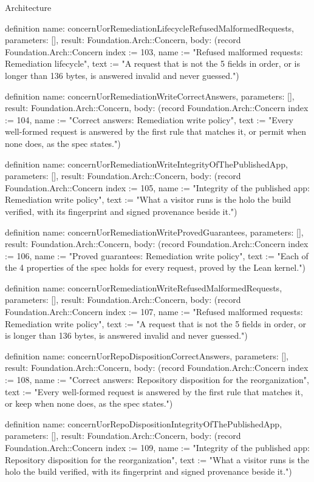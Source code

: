 \begin{lexlean}{Architecture}
\begin{semanticmodule}
definition{
  name: concernUorRemediationLifecycleRefusedMalformedRequests,
  parameters: [],
  result: Foundation.Arch::Concern,
  body: (record Foundation.Arch::Concern {index := 103, name := "Refused malformed requests: Remediation lifecycle", text := "A request that is not the 5 fields in order, or is longer than 136 bytes, is answered invalid and never guessed."})
}

definition{
  name: concernUorRemediationWriteCorrectAnswers,
  parameters: [],
  result: Foundation.Arch::Concern,
  body: (record Foundation.Arch::Concern {index := 104, name := "Correct answers: Remediation write policy", text := "Every well-formed request is answered by the first rule that matches it, or permit when none does, as the spec states."})
}

definition{
  name: concernUorRemediationWriteIntegrityOfThePublishedApp,
  parameters: [],
  result: Foundation.Arch::Concern,
  body: (record Foundation.Arch::Concern {index := 105, name := "Integrity of the published app: Remediation write policy", text := "What a visitor runs is the holo the build verified, with its fingerprint and signed provenance beside it."})
}

definition{
  name: concernUorRemediationWriteProvedGuarantees,
  parameters: [],
  result: Foundation.Arch::Concern,
  body: (record Foundation.Arch::Concern {index := 106, name := "Proved guarantees: Remediation write policy", text := "Each of the 4 properties of the spec holds for every request, proved by the Lean kernel."})
}

definition{
  name: concernUorRemediationWriteRefusedMalformedRequests,
  parameters: [],
  result: Foundation.Arch::Concern,
  body: (record Foundation.Arch::Concern {index := 107, name := "Refused malformed requests: Remediation write policy", text := "A request that is not the 5 fields in order, or is longer than 136 bytes, is answered invalid and never guessed."})
}

definition{
  name: concernUorRepoDispositionCorrectAnswers,
  parameters: [],
  result: Foundation.Arch::Concern,
  body: (record Foundation.Arch::Concern {index := 108, name := "Correct answers: Repository disposition for the reorganization", text := "Every well-formed request is answered by the first rule that matches it, or keep when none does, as the spec states."})
}

definition{
  name: concernUorRepoDispositionIntegrityOfThePublishedApp,
  parameters: [],
  result: Foundation.Arch::Concern,
  body: (record Foundation.Arch::Concern {index := 109, name := "Integrity of the published app: Repository disposition for the reorganization", text := "What a visitor runs is the holo the build verified, with its fingerprint and signed provenance beside it."})
}


\end{semanticmodule}
\end{lexlean}
